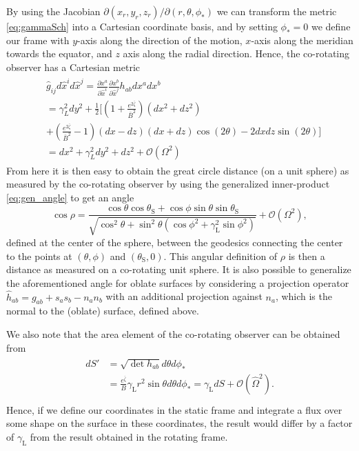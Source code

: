 \documentclass[iop, usenatbib]{emulateapj}
\newcommand{\be}{\begin{equation}}
\newcommand{\ee}{\end{equation}}
\newcommand{\Ob}{\ensuremath{\hat{\Omega}}}
\newcommand{\zetab}{\ensuremath{\bar{\zeta}}}
\newcommand{\Bb}{\ensuremath{\bar{B}}}
\newcommand{\lgamma}{\gamma_{\text{L}}}
\begin{document}
By using the Jacobian $\partial(x_r, y_r, z_r)/\partial (r, \theta, \phi_*)$ we can transform the metric \eqref{eq:gammaSch} into a Cartesian coordinate basis, and by setting $\phi_*=0$ we define our frame with $y$-axis along the direction of the motion, $x$-axis along the meridian towards the equator, and $z$ axis along the radial direction.
Hence, the co-rotating observer has a Cartesian metric
\begin{align}\begin{split}
    & \hat{g}_{ij} d\hat{x}^i d\hat{x}^j = \frac{\partial x^a}{\partial \hat{x}^i} \frac{\partial x^b}{\partial \hat{x}^j} h_{ab} dx^a dx^b  \\
&= \gamma_L^2 dy^2 + \frac{1}{2} [ (1+ \frac{e^{2\zetab}}{\Bb^2})(dx^2 + dz^2) \\
&+ (\frac{e^{2\zetab}}{\Bb^2} - 1)(dx-dz)(dx + dz) \cos(2\theta) - 2dx dz \sin(2\theta) ] \\
& = dx^2 + \gamma_L^2 dy^2 + dz^2 + \mathcal{O}(\Omega^2)
\end{split}\end{align}
From here it is then easy to obtain the great circle distance (on a unit sphere) as measured by the co-rotating observer by using the generalized inner-product \eqref{eq:gen_angle} to get an angle
\be\label{eq:rel_cos}
\cos\rho = \frac{\cos\theta \cos\theta_\mathrm{S} + \cos\phi \sin\theta \sin\theta_{\mathrm{S}}}{\sqrt{ \cos^2\theta + \sin^2\theta (\cos\phi^2 + \lgamma^2 \sin\phi^2)}} + \mathcal{O}(\Omega^2),
\ee
defined at the center of the sphere, between the geodesics connecting the center to the 
points at $(\theta, \phi)$ and $(\theta_{\mathrm{S}}, 0)$.
This angular definition of $\rho$ is then a distance as measured on a co-rotating unit sphere.
It is also possible to generalize the aforementioned angle for oblate surfaces by considering a projection operator $\hat{h}_{ab} = g_{ab} + s_a s_b - n_a n_b$ with an additional projection against $n_a$, which is the normal to the (oblate) surface, defined above.

We also note that the area element of the co-rotating observer can be obtained from
\begin{align}\begin{split}
dS' &= \sqrt{\det h_{ab}} d\theta d\phi_* \\
&= \frac{e^{\zetab}}{B} \lgamma r^2 \sin\theta d\theta d\phi_* = \lgamma dS + \mathcal{O}(\Ob^2). \\
\end{split}\end{align}
Hence, if we define our coordinates in the static frame and integrate a flux over some shape on the surface in these coordinates, the result would differ by a factor of $\lgamma$ from the result obtained in the rotating frame.
\end{document}
